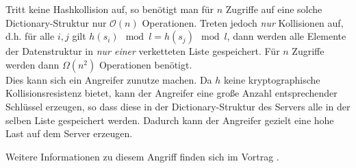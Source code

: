 Tritt keine Hashkollision auf, so benötigt man für $n$ Zugriffe auf eine solche Dictionary-Struktur nur $\mathcal{O}(n)$ Operationen. Treten jedoch \emph{nur} Kollisionen auf, d.h. für alle $i,j$ gilt $h(s_i) \mod l = h(s_j) \mod l$, dann werden alle Elemente der Datenstruktur in \emph{nur einer} verketteten Liste gespeichert. Für $n$ Zugriffe werden dann $\Omega(n^2)$ Operationen benötigt.\\

Dies kann sich ein Angreifer zunutze machen. Da $h$ keine kryptographische Kollisionsresistenz bietet, kann der Angreifer eine große Anzahl entsprechender Schlüssel erzeugen, so dass diese in der Dictionary-Struktur des Servers alle in der selben Liste gespeichert werden. Dadurch kann der Angreifer gezielt eine hohe Last auf dem Server erzeugen.

Weitere Informationen zu diesem Angriff finden sich im Vortrag \cite{Klink2011}.
